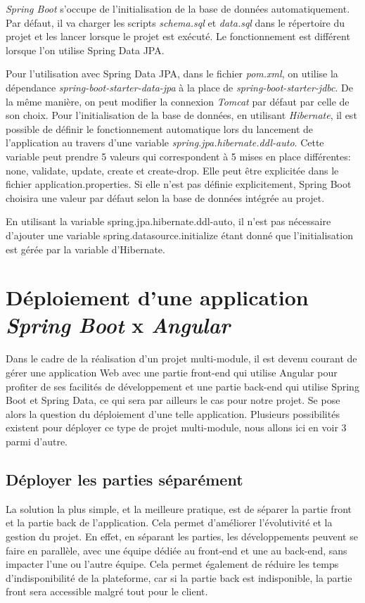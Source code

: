 \documentclass{polytech/polytech}
\begin{document}
\textit{Spring Boot} s’occupe de l’initialisation de la base de données automatiquement. Par défaut, il va charger les scripts \textit{schema.sql} et \textit{data.sql} dans le répertoire du projet et les lancer lorsque le projet est exécuté. Le fonctionnement est différent lorsque l’on utilise Spring Data JPA. 

Pour l’utilisation avec Spring Data JPA, dans le fichier \textit{pom.xml}, on utilise la dépendance \textit{spring-boot-starter-data-jpa} à la place de \textit{spring-boot-starter-jdbc}. De la même manière, on peut modifier la connexion \textit{Tomcat} par défaut par celle de son choix. Pour l’initialisation de la base de données, en utilisant \textit{Hibernate}, il est possible de définir le fonctionnement automatique lors du lancement de l’application au travers d’une variable \textit{spring.jpa.hibernate.ddl-auto}. Cette variable peut prendre 5 valeurs qui correspondent à 5 mises en place différentes: none, validate, update, create et create-drop. Elle peut être explicitée dans le fichier application.properties. Si elle n’est pas définie explicitement, Spring Boot choisira une valeur par défaut selon la base de données intégrée au projet. 

En utilisant la variable spring.jpa.hibernate.ddl-auto, il n’est pas nécessaire d’ajouter une variable  spring.datasource.initialize étant donné que l’initialisation est gérée par la variable d’Hibernate.


\section{Déploiement d'une application \textit{Spring Boot} x \textit{Angular}}


Dans le cadre de la réalisation d’un projet multi-module, il est devenu courant de gérer une application Web avec une partie front-end qui utilise Angular pour profiter de ses facilités de développement et une partie back-end qui utilise Spring Boot et Spring Data, ce qui sera par ailleurs le cas pour notre projet. Se pose alors la question du déploiement d’une telle application. Plusieurs possibilités existent pour déployer ce type de projet multi-module, nous allons ici en voir 3 parmi d’autre.

\subsection{Déployer les parties séparément}

La solution la plus simple, et la meilleure pratique, est de séparer la partie front et la partie back de l’application. Cela permet d’améliorer l’évolutivité et la gestion du projet. En effet, en séparant les parties, les développements peuvent se faire en parallèle, avec une équipe dédiée au front-end et une au back-end, sans impacter l’une ou l’autre équipe. Cela permet également de réduire les temps d’indisponibilité de la plateforme, car si la partie back est indisponible, la partie front sera accessible malgré tout pour le client.
\end{document}
